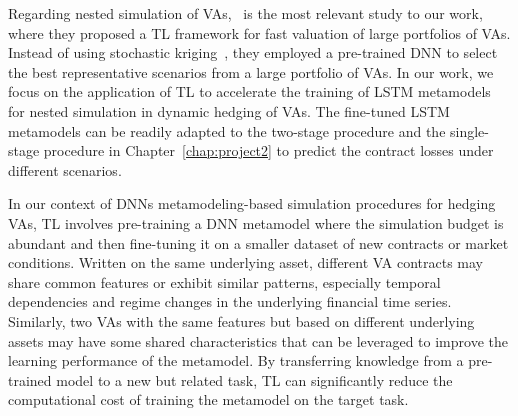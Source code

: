 Regarding nested simulation of VAs,~\cite{cheng2019fast} is the most relevant study to our work, where they proposed a TL framework for fast valuation of large portfolios of VAs.
Instead of using stochastic kriging~\citep{gan2015valuation}, they employed a pre-trained DNN to select the best representative scenarios from a large portfolio of VAs.
In our work, we focus on the application of TL to accelerate the training of LSTM metamodels for nested simulation in dynamic hedging of VAs.
The fine-tuned LSTM metamodels can be readily adapted to the two-stage procedure and the single-stage procedure in Chapter~\ref{chap:project2} to predict the contract losses under different scenarios.

In our context of DNNs metamodeling-based simulation procedures for hedging VAs, TL involves pre-training a DNN metamodel where the simulation budget is abundant and then fine-tuning it on a smaller dataset of new contracts or market conditions.
Written on the same underlying asset, different VA contracts may share common features or exhibit similar patterns, especially temporal dependencies and regime changes in the underlying financial time series.
Similarly, two VAs with the same features but based on different underlying assets may have some shared characteristics that can be leveraged to improve the learning performance of the metamodel.
By transferring knowledge from a pre-trained model to a new but related task, TL can significantly reduce the computational cost of training the metamodel on the target task.

